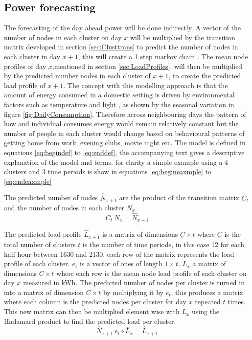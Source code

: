 \subsection{Power forecasting}
The forecasting of the day ahead power will be done indirectly. A vector of the number of nodes in each cluster on day $x$ will be multiplied by the transition matrix developed in section \ref{sec:Clusttrans} to predict the number of nodes in each cluster in day $x+1$, this will create a 1 step markov chain \cite{barber2012}. The mean node profiles of day $x$,mentioned in section \ref{sec:LoadProfiles}, will then be multiplied by the predicted number nodes in each cluster of $x+1$, to create the predicted load profile of $x+1$. The concept with this modelling approach is that the amount of energy consumed in a domestic setting is driven by environmental factors such as temperature and light  \cite{hmgovernment2014} \cite{homesshowgreatestseasonalvariationinelectricityusetodayinenergyusenergyinformationadministrationeia2013}, as shown by the seasonal variation in figure \ref{fig:DailyConsumption}. Therefore across neighbouring days the pattern of how and individual consumes energy would remain relatively constant but the number of people in each cluster would change based on behavioural patterns of getting home from work, evening clubs, movie night etc.
The model is defined in equations \ref{eq:begindef} to \ref{eq:enddef}, the accompanying text gives a descriptive explanation of the model and terms. for clarity a simple example using a 4 clusters and 3 time periods is show in equations \ref{eq:begineaxmple} to \ref{eq:endeaxmple}

The predicted number of nodes $\hat{N}_{x+1}$ are the product of the transition matrix $C_t$ and the number of nodes in each cluster $N_x$
\begin{equation}
C_t \:N_x=\hat{N}_{x+1}
\label{eq:begindef}
\end{equation}

The predicted load profile $\hat{L}_{x+1}$ is a matrix of dimensions $C\times t$ where $C$ is the total number of clusters $t$ is the number of time periods, in this case 12 for each half hour between 1630 and 2130, each row of the matrix represents the load profile of each cluster. $e_t$ is a vector of ones of length $1 \times t$. $\bar{L}_x$ a matrix of dimensions $C\times t$ where each row is the mean node load profile of each cluster on day $x$ measured in kWh. The predicted number of nodes per cluster is turned in into a matrix of dimension $C \times t$ by multiplying it by $e_t$, this produces a matrix where each column is the predicted nodes per cluster for day $x$ repeated $t$ times. This new matrix can then be multiplied element wise with $\bar{L}_x$ using the Hadamard product to find the predicted load per cluster.
\begin{equation}
\hat{N}_{x+1}\: e_t \circ \bar{L}_x=\hat{L}_{x+1}
\end{equation}

